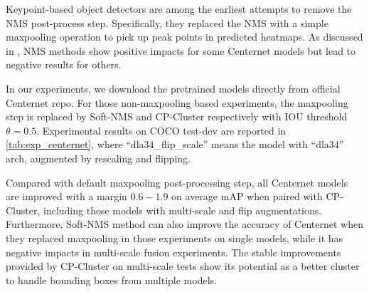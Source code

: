 \documentclass[10pt,twocolumn,letterpaper]{article}
\begin{document}
Keypoint-based object detectors\cite{law2018cornernet,zhou2019objects,lan2020saccadenet} are among the earliest attempts to remove the NMS post-process step. Specifically, they replaced the NMS with a simple maxpooling operation to pick up peak points in predicted heatmaps.
As discussed in \cite{zhou2019objects}, NMS methods show positive impacts for some Centernet models but lead to negative results for others.

In our experiments, we download the pretrained models directly from official Centernet repo\cite{zhou2019objects}. For those non-maxpooling based experiments, the maxpooling step is replaced by Soft-NMS and CP-Cluster respectively with IOU threshold $\theta=0.5$. Experimental results on COCO test-dev are reported in \cref{tab:exp_centernet}, where ``dla34\_flip\_scale'' means the model with ``dla34'' arch, augmented by rescaling and flipping.

Compared with default maxpooling post-processing step, all Centernet models are improved with a margin $0.6-1.9$ on average mAP when paired with CP-Cluster, including those models with multi-scale and flip augmentations.
Furthermore, Soft-NMS method can also improve the accuracy of Centernet when they replaced maxpooling in those experiments on single models, while it has negative impacts in multi-scale fusion experiments.
The stable improvements provided by CP-Cluster on multi-scale tests show its potential as a better cluster to handle bounding boxes from multiple models.
\end{document}
